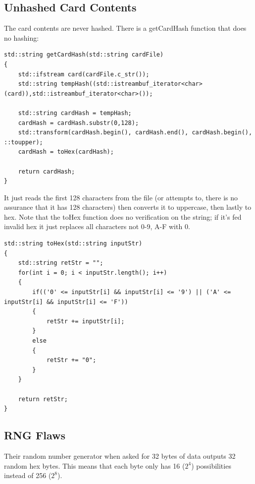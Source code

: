 \documentclass{article}
\begin{document}
\subsection{Unhashed Card Contents}
The card contents are never hashed. There is a getCardHash function that does no hashing:
\begin{lstlisting}
std::string getCardHash(std::string cardFile) 
{
    std::ifstream card(cardFile.c_str());
    std::string tempHash((std::istreambuf_iterator<char>(card)),std::istreambuf_iterator<char>());
    
    std::string cardHash = tempHash;
    cardHash = cardHash.substr(0,128);
    std::transform(cardHash.begin(), cardHash.end(), cardHash.begin(), ::toupper);
    cardHash = toHex(cardHash);
    
    return cardHash;
}
\end{lstlisting}
It just reads the first 128 characters from the file (or attempts to, there is no assurance that it has 128 characters) then converts it to uppercase, then lastly to hex. Note that the toHex function does no verification on the string; if it's fed invalid hex it just replaces all characters not 0-9, A-F with 0.
\begin{lstlisting}
std::string toHex(std::string inputStr)
{
    std::string retStr = "";
    for(int i = 0; i < inputStr.length(); i++)
    {
        if(('0' <= inputStr[i] && inputStr[i] <= '9') || ('A' <= inputStr[i] && inputStr[i] <= 'F'))
        {
            retStr += inputStr[i];
        }
        else
        {
            retStr += "0";
        }
    }

    return retStr;
}
\end{lstlisting}

\subsection{RNG Flaws}

Their random number generator when asked for 32 bytes of data outputs 32
random hex bytes. This means that each byte only has 16 ($2^{4}$) possibilities instead
of 256 ($2^{8}$).
\end{document}
